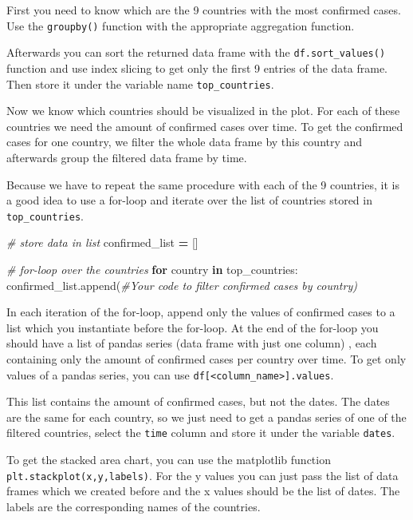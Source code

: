 \documentclass[
  11pt,
]{article}
\newenvironment{Shaded}{\begin{snugshade}}{\end{snugshade}}
\newcommand{\CommentTok}[1]{\textcolor[rgb]{0.56,0.35,0.01}{\textit{#1}}}
\newcommand{\ControlFlowTok}[1]{\textcolor[rgb]{0.13,0.29,0.53}{\textbf{#1}}}
\newcommand{\KeywordTok}[1]{\textcolor[rgb]{0.13,0.29,0.53}{\textbf{#1}}}
\newcommand{\NormalTok}[1]{#1}
\newcommand{\OperatorTok}[1]{\textcolor[rgb]{0.81,0.36,0.00}{\textbf{#1}}}
\newenvironment{tipsp}[1]
  {
  \begin{itemize}
  \footnotesize
  \renewcommand{\labelitemi}{
    \raisebox{-.7\height}[0pt][0pt]{
      {\setkeys{Gin}{width=3em,keepaspectratio}
        \texttt{[image: images/\#1.png]}}
    }
  }
  \setlength{\fboxsep}{1em}
  \begin{pbox}
  \item
  }
  {
  \end{pbox}
  \end{itemize}
  }
\begin{document}
\begin{tipsp}p

First you need to know which are the 9 countries with the most confirmed cases. Use the \texttt{groupby()} function with the appropriate aggregation function.

Afterwards you can sort the returned data frame with the \texttt{df.sort\_values()} function and use index slicing to get only the first 9 entries of the data frame. Then store it under the variable name \texttt{top\_countries}.

Now we know which countries should be visualized in the plot. For each of these countries we need the amount of confirmed cases over time. To get the confirmed cases for one country, we filter the whole data frame by this country and afterwards group the filtered data frame by time.

Because we have to repeat the same procedure with each of the 9 countries, it is a good idea to use a for-loop and iterate over the list of countries stored in \texttt{top\_countries}.

\begin{Shaded}
\begin{Highlighting}[]
\CommentTok{\# store data in list}
\NormalTok{confirmed\_list }\OperatorTok{=}\NormalTok{ []}
 
\CommentTok{\# for{-}loop over the countries}
\ControlFlowTok{for}\NormalTok{ country }\KeywordTok{in}\NormalTok{ top\_countries:}
\NormalTok{    confirmed\_list.append(}\CommentTok{\#Your code to filter confirmed cases by country)}
\end{Highlighting}
\end{Shaded}

In each iteration of the for-loop, append only the values of confirmed cases to a list which you instantiate before the for-loop. At the end of the for-loop you should have a list of pandas series (data frame with just one column) , each containing only the amount of confirmed cases per country over time. To get only values of a pandas series, you can use \texttt{df{[}\textless{}column\_name\textgreater{}{]}.values}.

This list contains the amount of confirmed cases, but not the dates. The dates are the same for each country, so we just need to get a pandas series of one of the filtered countries, select the \texttt{time} column and store it under the variable \texttt{dates}.

To get the stacked area chart, you can use the matplotlib function \texttt{plt.stackplot(x,y,labels)}. For the y values you can just pass the list of data frames which we created before and the x values should be the list of dates. The labels are the corresponding names of the countries.

\end{tipsp}
\end{document}
